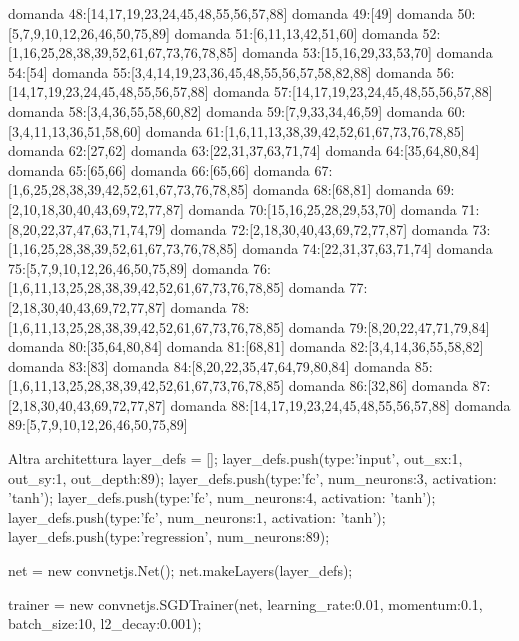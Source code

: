 domanda 48:[14,17,19,23,24,45,48,55,56,57,88]
domanda 49:[49]
domanda 50:[5,7,9,10,12,26,46,50,75,89]
domanda 51:[6,11,13,42,51,60]
domanda 52:[1,16,25,28,38,39,52,61,67,73,76,78,85]
domanda 53:[15,16,29,33,53,70]
domanda 54:[54]
domanda 55:[3,4,14,19,23,36,45,48,55,56,57,58,82,88]
domanda 56:[14,17,19,23,24,45,48,55,56,57,88]
domanda 57:[14,17,19,23,24,45,48,55,56,57,88]
domanda 58:[3,4,36,55,58,60,82]
domanda 59:[7,9,33,34,46,59]
domanda 60:[3,4,11,13,36,51,58,60]
domanda 61:[1,6,11,13,38,39,42,52,61,67,73,76,78,85]
domanda 62:[27,62]
domanda 63:[22,31,37,63,71,74]
domanda 64:[35,64,80,84]
domanda 65:[65,66]
domanda 66:[65,66]
domanda 67:[1,6,25,28,38,39,42,52,61,67,73,76,78,85]
domanda 68:[68,81]
domanda 69:[2,10,18,30,40,43,69,72,77,87]
domanda 70:[15,16,25,28,29,53,70]
domanda 71:[8,20,22,37,47,63,71,74,79]
domanda 72:[2,18,30,40,43,69,72,77,87]
domanda 73:[1,16,25,28,38,39,52,61,67,73,76,78,85]
domanda 74:[22,31,37,63,71,74]
domanda 75:[5,7,9,10,12,26,46,50,75,89]
domanda 76:[1,6,11,13,25,28,38,39,42,52,61,67,73,76,78,85]
domanda 77:[2,18,30,40,43,69,72,77,87]
domanda 78:[1,6,11,13,25,28,38,39,42,52,61,67,73,76,78,85]
domanda 79:[8,20,22,47,71,79,84]
domanda 80:[35,64,80,84]
domanda 81:[68,81]
domanda 82:[3,4,14,36,55,58,82]
domanda 83:[83]
domanda 84:[8,20,22,35,47,64,79,80,84]
domanda 85:[1,6,11,13,25,28,38,39,42,52,61,67,73,76,78,85]
domanda 86:[32,86]
domanda 87:[2,18,30,40,43,69,72,77,87]
domanda 88:[14,17,19,23,24,45,48,55,56,57,88]
domanda 89:[5,7,9,10,12,26,46,50,75,89]


Altra architettura
layer_defs = [];
layer_defs.push({type:'input', out_sx:1, out_sy:1, out_depth:89});
layer_defs.push({type:'fc', num_neurons:3, activation: 'tanh'});
layer_defs.push({type:'fc', num_neurons:4, activation: 'tanh'});
layer_defs.push({type:'fc', num_neurons:1, activation: 'tanh'});
layer_defs.push({type:'regression', num_neurons:89});

net = new convnetjs.Net();
net.makeLayers(layer_defs);

trainer = new convnetjs.SGDTrainer(net, {learning_rate:0.01, momentum:0.1, batch_size:10, l2_decay:0.001});

